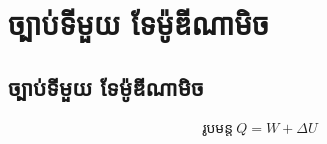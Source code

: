 \chapter{ច្បាប់ទីមួយ ទែម៉ូឌីណាមិច}
\section{ច្បាប់ទីមួយ ទែម៉ូឌីណាមិច}
\begin{align*}
  \text{រូបមន្ត}~Q = W + \Delta U
\end{align*}